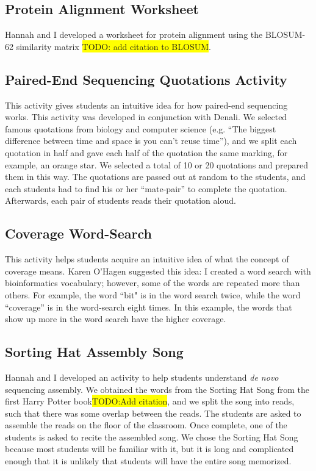 \documentclass{report}
\newcommand{\hilight}[1]
{\colorbox{yellow}{#1}}
\begin{document}
\subsection{Protein Alignment Worksheet}
Hannah and I developed a worksheet for protein alignment using the BLOSUM-62 similarity matrix \hilight{TODO: add citation to BLOSUM}.

\subsection{Paired-End Sequencing Quotations Activity}
This activity gives students an intuitive idea for how paired-end sequencing works. This activity was developed in conjunction with Denali. We selected famous quotations from biology and computer science (e.g. ``The biggest difference between time and space is you can't reuse time''), and we split each quotation in half and gave each half of the quotation the same marking, for example, an orange star. We selected a total of 10 or 20 quotations and prepared them in this way. The quotations are passed out at random to the students, and each students had to find his or her ``mate-pair'' to complete the quotation. Afterwards, each pair of students reads their quotation aloud.

\subsection{Coverage Word-Search}
This activity helps students acquire an intuitive idea of what the concept of coverage means. Karen O'Hagen suggested this idea: I created a word search with bioinformatics vocabulary; however, some of the words are repeated more than others. For example, the word ``bit" is in the word search twice, while the word ``coverage'' is in the word-search eight times. In this example, the words that show up more in the word search have the higher coverage.

\subsection{Sorting Hat Assembly Song}
Hannah and I developed an activity to help students understand \emph{de novo} sequencing assembly. We obtained the words from the Sorting Hat Song from the first Harry Potter book\hilight{TODO:Add citation}, and we split the song into reads, such that there was some overlap between the reads. The students are asked to assemble the reads on the floor of the classroom. Once complete,  one of the students is asked to recite the assembled song. We chose the Sorting Hat Song because most students will be familiar with it, but it is long and complicated enough that it is unlikely that students will have the entire song memorized. 
\end{document}
